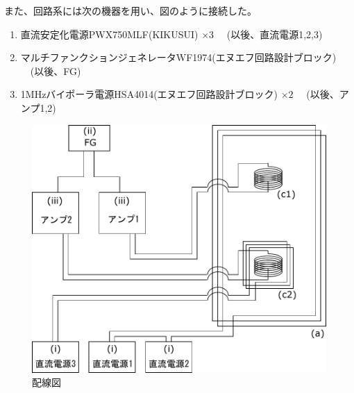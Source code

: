 また、回路系には次の機器を用い、図のように接続した。
\begin{enumerate}
\renewcommand{\labelenumi}{(\roman{enumi})}
\item 直流安定化電源PWX750MLF(KIKUSUI) $\times 3$ \ \ (以後、直流電源1,2,3)
\item マルチファンクションジェネレータWF1974(エヌエフ回路設計ブロック) \ \ (以後、FG)
\item 1MHzバイポーラ電源HSA4014(エヌエフ回路設計ブロック) $\times 2$ \ \ (以後、アンプ1,2)
\end{enumerate}

\vspace{1cm}
\begin{figure}[h]
\centering
\includegraphics[width=12cm]{resonance/whatwhyhow/kairozu.pdf}
\caption{配線図}
\end{figure}

\clearpage
